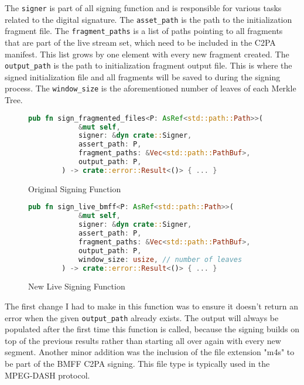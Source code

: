 The \texttt{signer} is part of all signing function and is responsible for various tasks related to the digital signature. The \texttt{asset\_path} is the path to the initialization fragment file. The \texttt{fragment\_paths} is a list of paths pointing to all fragments that are part of the live stream set, which need to be included in the C2PA manifest. This list grows by one element with every new fragment created. The \texttt{output\_path} is the path to initialization fragment output file. This is where the signed initialization file and all fragments will be saved to during the signing process. The \texttt{window\_size} is the aforementioned number of leaves of each Merkle Tree. 

\begin{figure}
    \begin{lstlisting}[language=Rust]
        pub fn sign_fragmented_files<P: AsRef<std::path::Path>>(
            &mut self,
            signer: &dyn crate::Signer,
            assert_path: P,
            fragment_paths: &Vec<std::path::PathBuf>,
            output_path: P,
        ) -> crate::error::Result<()> { ... }
    \end{lstlisting}
    \caption{Original Signing Function}
    \label{code:fragment_bmff}
\end{figure}

\begin{figure}
    \begin{lstlisting}[language=Rust]
        pub fn sign_live_bmff<P: AsRef<std::path::Path>>(
            &mut self,
            signer: &dyn crate::Signer,
            assert_path: P,
            fragment_paths: &Vec<std::path::PathBuf>,
            output_path: P,
            window_size: usize, // number of leaves
        ) -> crate::error::Result<()> { ... }
    \end{lstlisting}
    \caption{New Live Signing Function}
    \label{code:live_sign}
\end{figure}

The first change I had to make in this function was to ensure it doesn't return an error when the given \texttt{output\_path} already exists. The output will always be populated after the first time this function is called, because the signing builds on top of the previous results rather than starting all over again with every new segment. Another minor addition was the inclusion of the file extension "m4s" to be part of the BMFF C2PA signing. This file type is typically used in the MPEG-DASH protocol.

